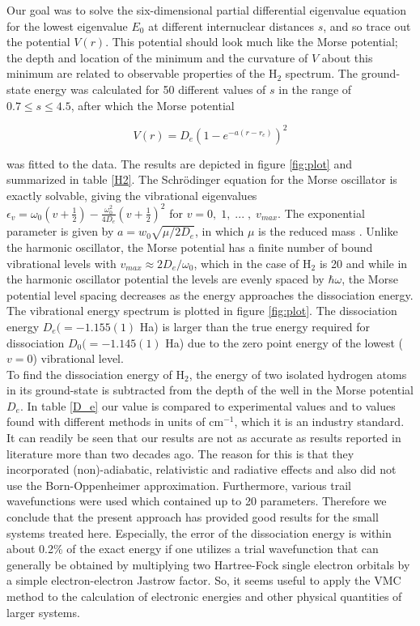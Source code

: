 \documentclass{article}
\begin{document}
Our goal was to solve the six-dimensional partial differential eigenvalue equation for the lowest eigenvalue $E_0$ at different internuclear distances $s$, and so trace out the potential $V(r)$. This potential should look much like the Morse potential; the depth and location of the minimum and the curvature of $V$ about this minimum are related to observable properties of the H$_2$ spectrum. The ground-state energy was calculated for 50 different values of $s$ in the range of $0.7\leq s \leq 4.5$, after which the Morse potential 

\begin{equation}
V(r) = D_e ( 1-e^{-a(r-r_e)} )^2 
\end{equation}

was fitted to the data. The results are depicted in figure \ref{fig:plot} and summarized in table \ref{H2}. The Schr\"odinger equation for the Morse oscillator is exactly solvable, giving the vibrational eigenvalues $\epsilon_v=\omega_0 (v+\frac12)-\frac{\omega_0^2}{4D_e}(v+\frac12)^2$ for $v=0,\;1,\;...\;,\;v_{max}$. The exponential parameter is given by $a=w_0\sqrt{\mu/2D_e}$, in which $\mu$ is the reduced mass \citep{morse1929diatomic}. Unlike the harmonic oscillator, the Morse potential has a finite number of bound vibrational levels with $v_{max} \approx 2D_e/\omega_0$, which in the case of H$_2$ is 20 and while in the harmonic oscillator potential the levels are evenly spaced by $\hbar \omega$, the Morse potential level spacing decreases as the energy approaches the dissociation energy. The vibrational energy spectrum is plotted in figure \ref{fig:plot}. The dissociation energy $D_e(=-1.155(1)$ Ha) is larger than the true energy required for dissociation $D_0(=-1.145(1)$ Ha) due to the zero point energy of the lowest ($v = 0$) vibrational level.\\

To find the dissociation energy of H$_2$, the energy of two isolated hydrogen atoms in its ground-state is subtracted from the depth of the well in the Morse potential $D_e$. In table \ref{D_e} our value is compared to experimental values and to values found with different methods in units of cm$^{-1}$, which it is an industry standard. It can readily be seen that our results are not as accurate as results reported in literature \citep{traynor1991quantum, szalewicz1986new, wolniewicz1983x} more than two decades ago. The reason for this is that they incorporated (non)-adiabatic, relativistic and radiative effects and also did not use the Born-Oppenheimer approximation. Furthermore, various trail wavefunctions were used which contained up to 20 parameters. Therefore we conclude that the present approach has provided good results for the small systems treated here. Especially, the error of the dissociation energy is within about 0.2\% of the exact energy if one utilizes a trial wavefunction that can generally be obtained by multiplying two Hartree-Fock single electron orbitals by a simple electron-electron Jastrow factor. So, it seems useful to apply the VMC method to the calculation of electronic energies and other physical quantities of larger systems.
\end{document}
